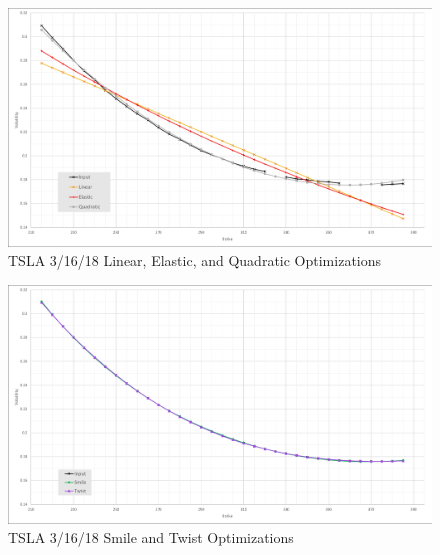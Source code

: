 \documentclass[12pt, a4paper, notitlepage]{article}
\numberwithin{equation}{subsection}
\numberwithin{figure}{subsection}
\numberwithin{table}{subsection}
\begin{document}
\begin{figure}[H]
	\caption{TSLA 3/16/18 Linear, Elastic, and Quadratic Optimizations}
	\centerline{\includegraphics[width=1\textwidth]{SampleLinElastQuadOptimizations}}
	\label{fig:SampleLinElastQuadOptimizations}
\end{figure}

\begin{figure}[H]
	\caption{TSLA 3/16/18 Smile and Twist Optimizations}
	\centerline{\includegraphics[width=1\textwidth]{SampleSmileTwistOptimizations}}
	\label{fig:SampleSmileTwistOptimizations}
\end{figure}
\end{document}
